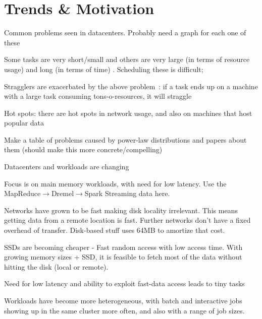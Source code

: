 \section{Trends \& Motivation}

Common problems seen in datacenters. Probably need a graph for each one of these
\begin{myitemize}
  \item  Some tasks are very short/small and others are very large (in terms of
    resource usage) and long (in terms of time) .  
    Scheduling these is difficult; 

  \item Stragglers are exacerbated by the above problem~: if a task
    ends up on a machine with a large task consuming tons-o-resources, it will
    straggle

  \item Hot spots: there are hot spots in network usage, and also on machines
    that host popular data
\end{myitemize}

Make a table of problems caused by power-law distributions and papers about
them (should make this more concrete/compelling)

Datacenters and workloads are changing
\begin{myitemize}
  \item Focus is on main memory workloads, with need for low latency. Use the
    MapReduce$\rightarrow$Dremel$\rightarrow$Spark Streaming data here.
  \item Networks have grown to be fast making disk locality irrelevant. This
    means getting data from a remote location is fast. Further networks don't
    have a fixed overhead of transfer. Disk-based stuff uses 64MB to amortize
    that cost.  
  \item SSDs are becoming cheaper - Fast random access with low access time.
    With growing memory sizes + SSD, it is feasible to fetch most of the data
    without hitting the disk (local or remote).
  \item Need for low latency and ability to exploit fast-data access leads to
    tiny tasks
  \item Workloads have become more heterogeneous, with batch and interactive jobs
  showing up in the same cluster more often, and also with a range of job sizes.
\end{myitemize}
